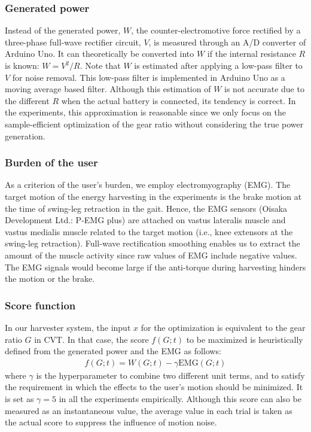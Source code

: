 \documentclass[twocolumn]{svjour3}          %
\begin{document}
\subsubsection{Generated power}

Instead of the generated power, $W$, the counter-electromotive force rectified by a three-phase full-wave rectifier circuit, $V$, is measured through an A/D converter of Arduino Uno.
It can theoretically be converted into $W$ if the internal resistance $R$ is known: $W = V^2/R$.
Note that $W$ is estimated after applying a low-pass filter to $V$ for noise removal.
This low-pass filter is implemented in Arduino Uno as a moving average based filter.
Although this estimation of $W$ is not accurate due to the different $R$ when the actual battery is connected, its tendency is correct.
In the experiments, this approximation is reasonable since we only focus on the sample-efficient optimization of the gear ratio without considering the true power generation.

\subsubsection{Burden of the user}

As a criterion of the user's burden, we employ electromyography (EMG).
The target motion of the energy harvesting in the experiments is the brake motion at the time of swing-leg retraction in the gait.
Hence, the EMG sensors (Oisaka Development Ltd.: P-EMG plus) are attached on vastus lateralis muscle and vastus medialis muscle related to the target motion (i.e., knee extensors at the swing-leg retraction).
Full-wave rectification smoothing enables us to extract the amount of the muscle activity since raw values of EMG include negative values.
The EMG signals would become large if the anti-torque during harvesting hinders the motion or the brake.

\subsubsection{Score function}

In our harvester system, the input $x$ for the optimization is equivalent to the gear ratio $G$ in CVT.
In that case, the score $f(G; t)$ to be maximized is heuristically defined from the generated power and the EMG as follows:
\begin{align}
	f(G;t ) = W(G; t) - \gamma \mathrm{EMG}(G; t)
    \label{eq:score}
\end{align}
where $\gamma$ is the hyperparameter to combine two different unit terms, and to satisfy the requirement in which the effects to the user's motion should be minimized.
It is set as $\gamma = 5$ in all the experiments empirically.
Although this score can also be measured as an instantaneous value, the average value in each trial is taken as the actual score to suppress the influence of motion noise.
\end{document}
